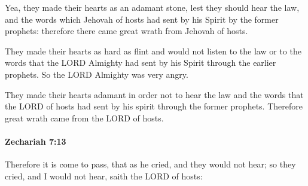 			\begin{versebox}
					\item[BHS] 
					\item[LXX] 
					\item[ASV] Yea, they made their hearts as an adamant stone, lest they should hear the law, and the words which Jehovah of hosts had sent by his Spirit by the former prophets: therefore there came great wrath from Jehovah of hosts.
					\item[NIV] They made their hearts as hard as flint and would not listen to the law or to the words that the LORD Almighty had sent by his Spirit through the earlier prophets. So the LORD Almighty was very angry.
					\item[NRSV] They made their hearts adamant in order not to hear the law and the words that the LORD of hosts had sent by his spirit through the former prophets. Therefore great wrath came from the LORD of hosts.
			\end{versebox}

		\paragraph{Zechariah 7:13} %
			\label{ZECHARIAH-7-13}

			Therefore it is come to pass, that as he cried, and they would not hear; so they cried, and I would not hear, saith the LORD of hosts:

